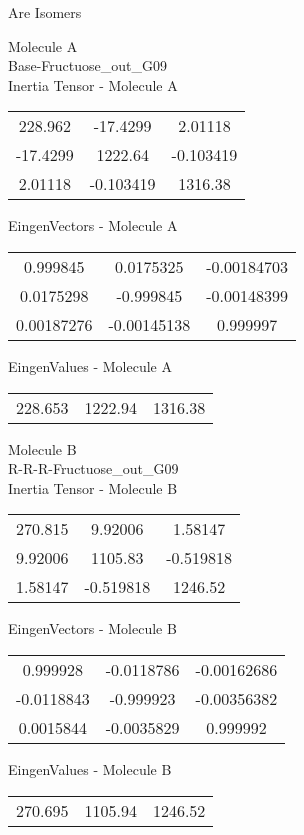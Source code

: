 \begin{center}
\vtab
\vtab
\textcolor{NavyBlue}{\Large Are Isomers}
\end{center}
\newpage
\begin{multicols}{2}
\begin{center}
Molecule A \\ 
Base-Fructuose\_out\_G09
\\
Inertia Tensor - Molecule A \\
\vtab
\begin{tabular}{|c c c|}
228.962	 & 	-17.4299	 & 	2.01118	 \\
-17.4299	 & 	1222.64	 & 	-0.103419	 \\
2.01118	 & 	-0.103419	 & 	1316.38
\end{tabular}

\vtab
 EingenVectors - Molecule A     \\
\vtab
\begin{tabular}{|c c c|}
0.999845	 & 	0.0175325	 & 	-0.00184703	 \\
0.0175298	 & 	-0.999845	 & 	-0.00148399	 \\
0.00187276	 & 	-0.00145138	 & 	0.999997
\end{tabular}

\vtab
 EingenValues - Molecule A     \\
\vtab
\begin{tabular}{|c c c|}
228.653	 & 	1222.94	 & 	1316.38
\end{tabular}
\columnbreak

Molecule B \\ 
R-R-R-Fructuose\_out\_G09
\\
Inertia Tensor - Molecule B \\
\vtab
\begin{tabular}{|c c c|}
270.815	 & 	9.92006	 & 	1.58147	 \\
9.92006	 & 	1105.83	 & 	-0.519818	 \\
1.58147	 & 	-0.519818	 & 	1246.52
\end{tabular}

\vtab
 EingenVectors - Molecule B     \\
\vtab
\begin{tabular}{|c c c|}
0.999928	 & 	-0.0118786	 & 	-0.00162686	 \\
-0.0118843	 & 	-0.999923	 & 	-0.00356382	 \\
0.0015844	 & 	-0.0035829	 & 	0.999992
\end{tabular}

\vtab
 EingenValues - Molecule B     \\
\vtab
\begin{tabular}{|c c c|}
270.695	 & 	1105.94	 & 	1246.52
\end{tabular}

\end{center}
\end{multicols}
